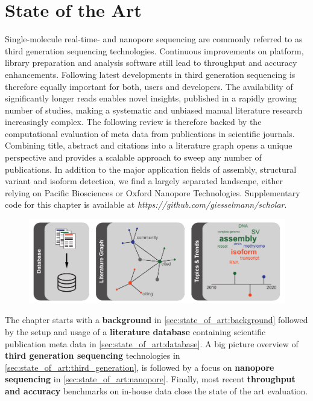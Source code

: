 \chapter{State of the Art}
\label{cha:state_of_art}

Single-molecule real-time- and nanopore sequencing are commonly referred to as third generation sequencing technologies.
Continuous improvements on platform, library preparation and analysis software still lead to throughput and accuracy enhancements.
Following latest developments in third generation sequencing is therefore equally important for both, users and developers.
The availability of significantly longer reads enables novel insights, published in a rapidly growing number of studies, making a systematic and unbiased manual literature research increasingly complex.
The following review is therefore backed by the computational evaluation of meta data from publications in scientific journals.
Combining title, abstract and citations into a literature graph opens a unique perspective and provides a scalable approach to sweep any number of publications.
In addition to the major application fields of assembly, structural variant and isoform detection, we find a largely separated landscape, either relying on Pacific Biosciences or Oxford Nanopore Technologies.
Supplementary code for this chapter is available at \textit{https://github.com/giesselmann/scholar}.

\begin{figure}[h]
	\centering
	\includegraphics[width=1.0\textwidth]{figures/state_of_art/GA.pdf}
	\label{fig:state_of_art:ga}
\end{figure}

The chapter starts with a \textbf{background} in \ref{sec:state_of_art:background} followed by the setup and usage of a \textbf{literature database} containing scientific publication meta data in \ref{sec:state_of_art:database}. A big picture overview of \textbf{third generation sequencing} technologies in \ref{sec:state_of_art:third_generation}, is followed by a focus on \textbf{nanopore sequencing} in \ref{sec:state_of_art:nanopore}. Finally, most recent \textbf{throughput and accuracy} benchmarks on in-house data close the state of the art evaluation.




